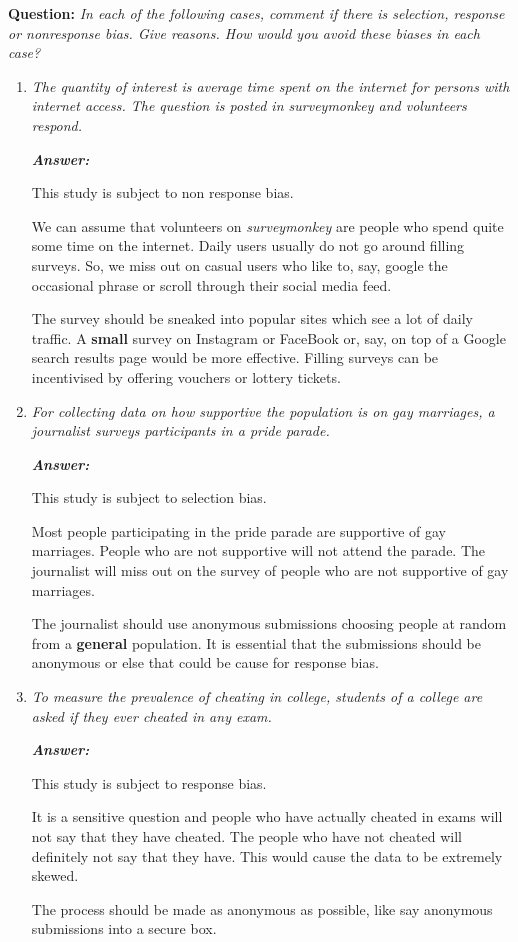 \documentclass[12pt,letterpaper]{article}
\begin{document}
\textbf{Question:}
\textit{In each of the following cases, comment if there is selection, response or nonresponse bias. Give reasons. How would you avoid these biases in each case?}

\begin{enumerate}[1.] \setlength{\itemsep}{30pt}
  \item \textit{The quantity of interest is average time spent on the internet for persons with internet access. The question is posted in surveymonkey and volunteers respond.}

  \textbf{\textit{Answer: }}
  
  This study is subject to non response bias.

  We can assume that volunteers on \textit{surveymonkey} are people who spend quite some time on the internet.
  Daily users usually do not go around filling surveys.
  So, we miss out on casual users who like to, say, google the occasional phrase or scroll through their social media feed.

  The survey should be sneaked into popular sites which see a lot of daily traffic.
  A \textbf{small} survey on Instagram or FaceBook or, say, on top of a Google search results page would be more effective.
  Filling surveys can be incentivised by offering vouchers or lottery tickets.
  \item \textit{For collecting data on how supportive the population is on gay marriages, a journalist surveys participants in a pride parade.}
  
  \textbf{\textit{Answer: }}
  
  This study is subject to selection bias.

  Most people participating in the pride parade are supportive of gay marriages.
  People who are not supportive will not attend the parade.
  The journalist will miss out on the survey of people who are not supportive of gay marriages.

  The journalist should use anonymous submissions choosing people at random from a \textbf{general} population.
  It is essential that the submissions should be anonymous or else that could be cause for response bias.
  
  \item \textit{To measure the prevalence of cheating in college, students of a college are asked if they ever cheated in any exam.}
  
  \textbf{\textit{Answer: }}

  This study is subject to response bias.

  It is a sensitive question and people who have actually cheated in exams will not say that they have cheated.
  The people who have not cheated will definitely not say that they have.
  This would cause the data to be extremely skewed.

  The process should be made as anonymous as possible, like say anonymous submissions into a secure box.

\end{enumerate}
\end{document}

